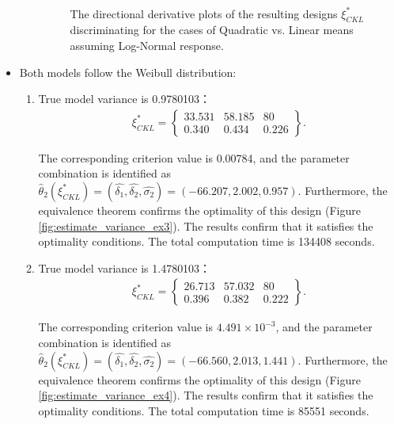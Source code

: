 \begin{itemize}
\begin{enumerate}
\begin{figure}[H]
\centering
{}
 \\
\caption{The directional derivative plots of the resulting designs $\xi^*_{CKL}$ discriminating for the cases of Quadratic vs. Linear means assuming Log-Normal response.}
\label{fig:DeviceA_estimate_variance_lognormal}
\end{figure}

\end{enumerate}

\item Both models follow the Weibull distribution:

\begin{enumerate}

\item True model variance is 0.9780103：
\begin{align*}
\xi^*_{CKL} = \left\{\begin{array}{ccc}
33.531 & 58.185 & 80 \\
0.340 & 0.434 & 0.226
\end{array}\right\}.
\end{align*}

The corresponding criterion value is 0.00784, and the parameter combination is identified as $\hat{\theta}_2(\xi^*_{CKL})=(\hat{\delta_1},\hat{\delta_2},\hat{\sigma_2})=(-66.207, 2.002, 0.957)$. Furthermore, the equivalence theorem confirms the optimality of this design (Figure \ref{fig:estimate_variance_ex3}). The results confirm that it satisfies the optimality conditions. The total computation time is 134408 seconds.

\item True model variance is 1.4780103：
\begin{align*}
\xi^*_{CKL} = \left\{\begin{array}{ccc}
26.713 & 57.032 & 80 \\
0.396 & 0.382 & 0.222
\end{array}\right\}.
\end{align*}

The corresponding criterion value is $4.491\times 10^{-3}$, and the parameter combination is identified as $\hat{\theta}_2(\xi^*_{CKL})=(\hat{\delta_1},\hat{\delta_2},\hat{\sigma_2})=(-66.560, 2.013, 1.441)$. Furthermore, the equivalence theorem confirms the optimality of this design (Figure \ref{fig:estimate_variance_ex4}). The results confirm that it satisfies the optimality conditions. The total computation time is 85551 seconds.


\end{enumerate}
\end{itemize}
